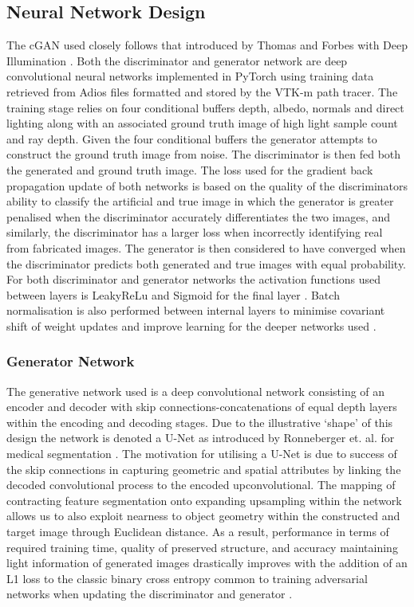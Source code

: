 \documentclass[conference]{IEEEtran}
\begin{document}
\subsection{Neural Network Design}

The cGAN used closely follows that introduced by Thomas and Forbes with Deep Illumination \cite{deepillum}. Both the discriminator and generator network are deep convolutional neural networks implemented in PyTorch using training data retrieved from Adios files formatted and stored by the VTK-m path tracer. The training stage relies on four conditional buffers depth, albedo, normals and direct lighting along with an associated ground truth image of high light sample count and ray depth. Given the four conditional buffers the generator attempts to construct the ground truth image from noise. The discriminator is then fed both the generated and ground truth image. The loss used for the gradient back propagation update of both networks is based on the quality of the discriminators ability to classify the artificial and true image in which the generator is greater penalised when the discriminator accurately differentiates the two images, and similarly, the discriminator has a larger loss when incorrectly identifying real from fabricated images. The generator is then considered to have converged when the discriminator predicts both generated and true images with equal probability. For both discriminator and generator networks the activation functions used between layers is LeakyReLu and Sigmoid for the final layer \cite{maasLeaky}. Batch normalisation is also performed between internal layers to minimise covariant shift of weight updates and improve learning for the deeper networks used \cite{ioffeBatch}.

\subsubsection{Generator Network}

The generative network used is a deep convolutional network consisting of an encoder and decoder with skip connections-concatenations of equal depth layers within the encoding and decoding stages. Due to the illustrative `shape' of this design the network is denoted a U-Net as introduced by Ronneberger et. al. for medical segmentation \cite{ronnebergerUnet}. The motivation for utilising a U-Net is due to success of the skip connections in capturing geometric and spatial attributes by linking the decoded convolutional process to the encoded upconvolutional. The mapping of contracting feature segmentation onto expanding upsampling within the network allows us to also exploit nearness to object geometry within the constructed and target image through Euclidean distance. As a result, performance in terms of required training time, quality of preserved structure, and accuracy maintaining light information of generated images drastically improves with the addition of an L1 loss to the classic binary cross entropy common to training adversarial networks when updating the discriminator and generator  \cite{isolaL1}\cite{goodfellowGAN}. 
\end{document}
